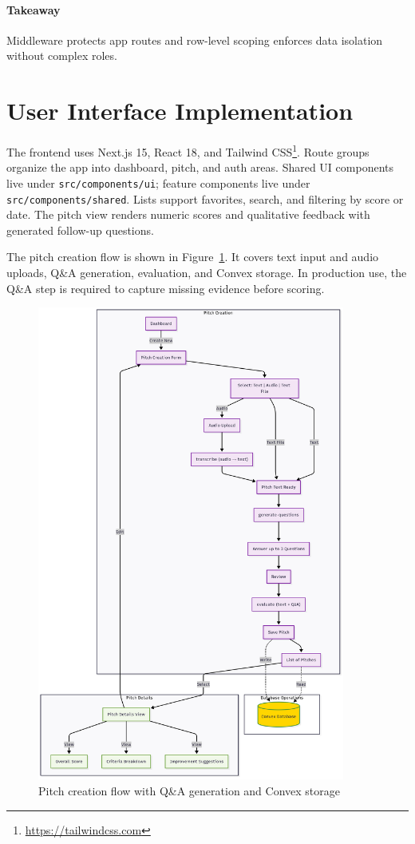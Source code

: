 \paragraph{Takeaway} Middleware protects app routes and row-level scoping enforces data isolation without complex roles.

\section{User Interface Implementation}
The frontend uses Next.js 15, React 18, and Tailwind CSS\footnote{\url{https://tailwindcss.com}}. Route groups organize the app into dashboard, pitch, and auth areas. Shared UI components live under \texttt{src/components/ui}; feature components live under \texttt{src/components/shared}. Lists support favorites, search, and filtering by score or date. The pitch view renders numeric scores and qualitative feedback with generated follow\mbox{-}up questions.

The pitch creation flow is shown in Figure~\ref{fig:user-flow-pitch}. It covers text input and audio uploads, Q\&A generation, evaluation, and Convex storage. In production use, the Q\&A step is required to capture missing evidence before scoring.

\begin{figure}[H]
  \centering
  \includegraphics[width=0.9\textwidth]{img/user-flow-pitch}
\caption{Pitch creation flow with Q\&A generation and Convex storage}
  \label{fig:user-flow-pitch}
\end{figure}

